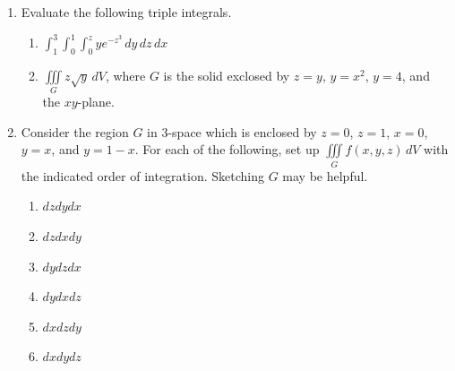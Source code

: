 \documentclass[12pt]{article}
\newif\ifans
\begin{document}
\begin{enumerate}

\item Evaluate the following triple integrals.

\begin{enumerate}

\item $\int_1^3 \int_0^1 \int_0^z ye^{-z^3} \,dy\,dz\,dx$

\ifans{\fbox{$\frac{1}{3}\left(1-\frac{1}{e}\right)$}} \fi

\item $\iiint \limits_{G} z\sqrt{y} \,dV$, where $G$ is the solid exclosed by $z=y$, $y=x^2$, $y=4$, and the $xy$-plane.

\ifans{\fbox{64}} \fi

\end{enumerate}

\item Consider the region $G$ in 3-space which is enclosed by $z=0$, $z=1$, $x=0$, $y=x$, and $y=1-x$.  For each of the following, set up $\iiint \limits_{G} f(x,y,z)\,dV$ with the indicated order of integration.  Sketching $G$ may be helpful.

\begin{enumerate}

\item $dzdydx$

\ifans{\fbox{$\int_0^{1/2} \int_x^{1-x} \int_0^1 f(x,y,z) \,dz\,dy\,dx$}} \fi

\item $dzdxdy$

\ifans{\fbox{$\int_0^{1/2} \int_0^y \int_0^1 f(x,y,z) \,dz\,dx\,dy+\int_{1/2}^1 \int_0^{1-y} \int_0^1 f(x,y,z)\,dz\,dx\,dy$}} \fi

\item $dydzdx$

\ifans{\fbox{$\int_0^{1/2} \int_0^1 \int_x^{1-x} f(x,y,z) \,dy\,dz\,dx$}} \fi

\item $dydxdz$

\ifans{\fbox{$\int_0^1 \int_0^{1/2} \int_x^{1-x} f(x,y,z) \,dy\,dx\,dz$}} \fi

\item $dxdzdy$

\ifans{\fbox{$\int_0^{1/2} \int_0^1 \int_0^y f(x,y,z) \,dx\,dz\,dy+\int_{1/2}^1 \int_0^1 \int_0^{1-y} f(x,y,z)\,dx\,dz\,dy$}} \fi

\item $dxdydz$


\end{enumerate}
\end{enumerate}
\end{document}
